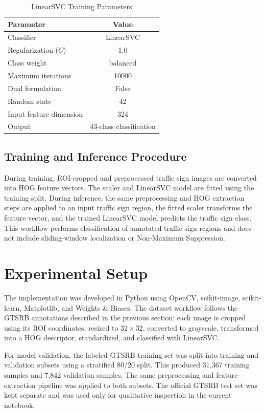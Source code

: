 \documentclass[conference]{IEEEtran}
\begin{document}
\begin{table}[htbp]
\caption{LinearSVC Training Parameters}
\label{tab:svm}
\centering
\begin{tabular}{lc}
\toprule
Parameter & Value\\
\midrule
Classifier & LinearSVC\\
Regularization ($C$) & 1.0\\
Class weight & balanced\\
Maximum iterations & 10000\\
Dual formulation & False\\
Random state & 42\\
Input feature dimension & 324\\
Output & 43-class classification\\
\bottomrule
\end{tabular}
\end{table}

\subsection{Training and Inference Procedure}

During training, ROI-cropped and preprocessed traffic sign images are converted into HOG feature vectors. The scaler and LinearSVC model are fitted using the training split. During inference, the same preprocessing and HOG extraction steps are applied to an input traffic sign region, the fitted scaler transforms the feature vector, and the trained LinearSVC model predicts the traffic sign class. This workflow performs classification of annotated traffic sign regions and does not include sliding-window localization or Non-Maximum Suppression.

\section{Experimental Setup}
\label{sec:experimental-setup}

The implementation was developed in Python using OpenCV, scikit-image, scikit-learn, Matplotlib, and Weights \& Biases. The dataset workflow follows the GTSRB annotations described in the previous section: each image is cropped using its ROI coordinates, resized to $32 \times 32$, converted to grayscale, transformed into a HOG descriptor, standardized, and classified with LinearSVC.

For model validation, the labeled GTSRB training set was split into training and validation subsets using a stratified 80/20 split. This produced 31,367 training samples and 7,842 validation samples. The same preprocessing and feature-extraction pipeline was applied to both subsets. The official GTSRB test set was kept separate and was used only for qualitative inspection in the current notebook.
\end{document}
